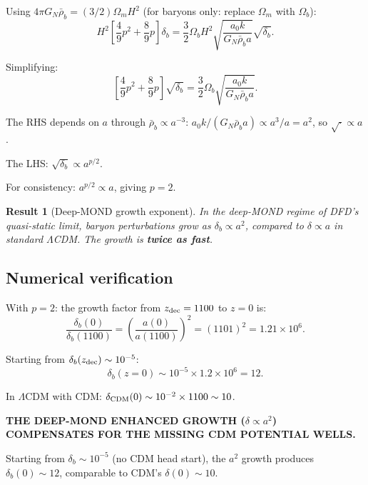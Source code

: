\documentclass[11pt]{article}
\newtheorem{result}{Result}
\newcommand{\ee}[1]{\times 10^{#1}}
\newcommand{\LCDM}{$\Lambda$CDM}
\begin{document}
Using $4\pi G_N\bar\rho_b = (3/2)\Omega_m H^2$ (for baryons only:
replace $\Omega_m$ with $\Omega_b$):
\begin{equation}
H^2\left[\frac{4}{9}p^2 + \frac{8}{9}p\right]\delta_b
= \frac{3}{2}\Omega_b H^2\sqrt{\frac{a_0 k}{G_N\bar\rho_b a}}\sqrt{\delta_b}.
\end{equation}

Simplifying:
\begin{equation}
\left[\frac{4}{9}p^2 + \frac{8}{9}p\right]\sqrt{\delta_b}
= \frac{3}{2}\Omega_b\sqrt{\frac{a_0 k}{G_N\bar\rho_b a}}.
\end{equation}

The RHS depends on $a$ through $\bar\rho_b \propto a^{-3}$:
$a_0 k/(G_N\bar\rho_b a) \propto a^{3}/a = a^2$, so $\sqrt{\cdot} \propto a$.

The LHS: $\sqrt{\delta_b} \propto a^{p/2}$.

For consistency: $a^{p/2} \propto a$, giving $p = 2$.

\begin{result}[Deep-MOND growth exponent]
\label{res:growth}
In the deep-MOND regime of DFD's quasi-static limit,
baryon perturbations grow as $\delta_b \propto a^2$,
compared to $\delta \propto a$ in standard $\Lambda$CDM.
The growth is \textbf{twice as fast}.
\end{result}

\subsection{Numerical verification}

With $p = 2$: the growth factor from $z_{\rm dec} = 1100$ to $z = 0$ is:
\begin{equation}
\frac{\delta_b(0)}{\delta_b(1100)} = \left(\frac{a(0)}{a(1100)}\right)^2
= (1101)^2 = 1.21\ee{6}.
\end{equation}

Starting from $\delta_b(z_{\rm dec}) \sim 10^{-5}$:
\begin{equation}
\delta_b(z=0) \sim 10^{-5}\times 1.2\ee{6} = 12.
\end{equation}

In \LCDM{} with CDM: $\delta_{\rm CDM}(0) \sim 10^{-2}\times 1100 \sim 10$.

\textbf{THE DEEP-MOND ENHANCED GROWTH ($\delta \propto a^2$) COMPENSATES
FOR THE MISSING CDM POTENTIAL WELLS.}

Starting from $\delta_b \sim 10^{-5}$ (no CDM head start), the $a^2$
growth produces $\delta_b(0) \sim 12$, comparable to CDM's $\delta(0) \sim 10$.
\end{document}

